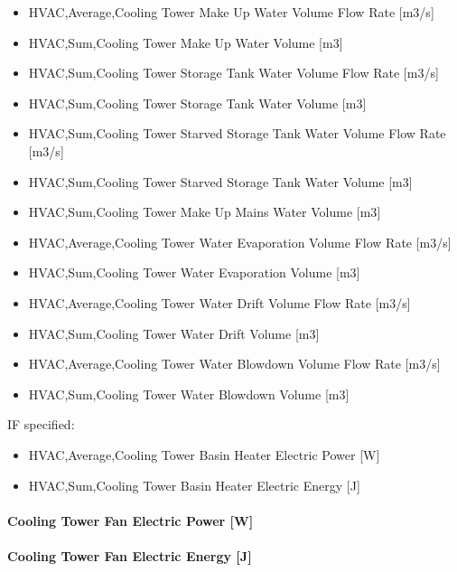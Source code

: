 \begin{itemize}
\item
  HVAC,Average,Cooling Tower Make Up Water Volume Flow Rate {[}m3/s{]}
\item
  HVAC,Sum,Cooling Tower Make Up Water Volume {[}m3{]}
\item
  HVAC,Sum,Cooling Tower Storage Tank Water Volume Flow Rate {[}m3/s{]}
\item
  HVAC,Sum,Cooling Tower Storage Tank Water Volume {[}m3{]}
\item
  HVAC,Sum,Cooling Tower Starved Storage Tank Water Volume Flow Rate {[}m3/s{]}
\item
  HVAC,Sum,Cooling Tower Starved Storage Tank Water Volume {[}m3{]}
\item
  HVAC,Sum,Cooling Tower Make Up Mains Water Volume {[}m3{]}
\item
  HVAC,Average,Cooling Tower Water Evaporation Volume Flow Rate {[}m3/s{]}
\item
  HVAC,Sum,Cooling Tower Water Evaporation Volume {[}m3{]}
\item
  HVAC,Average,Cooling Tower Water Drift Volume Flow Rate {[}m3/s{]}
\item
  HVAC,Sum,Cooling Tower Water Drift Volume {[}m3{]}
\item
  HVAC,Average,Cooling Tower Water Blowdown Volume Flow Rate {[}m3/s{]}
\item
  HVAC,Sum,Cooling Tower Water Blowdown Volume {[}m3{]}
\end{itemize}

IF specified:

\begin{itemize}
\item
  HVAC,Average,Cooling Tower Basin Heater Electric Power {[}W{]}
\item
  HVAC,Sum,Cooling Tower Basin Heater Electric Energy {[}J{]}
\end{itemize}

\paragraph{Cooling Tower Fan Electric Power {[}W{]}}\label{cooling-tower-fan-electric-power-w-2}

\paragraph{Cooling Tower Fan Electric Energy {[}J{]}}\label{cooling-tower-fan-electric-energy-j-2}

